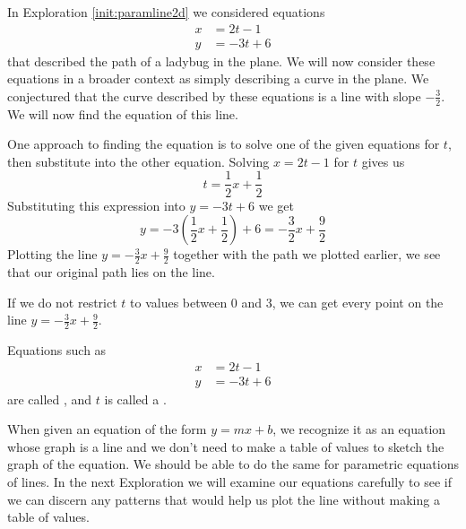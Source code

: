 \documentclass{ximera}
\begin{document}
\begin{exploration}\label{init:paramline2dpart2}
In Exploration \ref{init:paramline2d} we considered equations
\begin{align*}
x&=2t-1\\
y&=-3t+6
\end{align*}
that described the path of a ladybug in the plane.  We will now consider these equations in a broader context as simply describing a curve in the plane.  We conjectured that the curve described by these equations is a line with slope $-\frac{3}{2}$.  We will now find the equation of this line.
 
One approach to finding the equation is to solve one of the given equations for $t$, then substitute into the other equation.
Solving $x=2t-1$ for $t$ gives us
$$t=\frac{1}{2}x+\frac{1}{2}$$
Substituting this expression into $y=-3t+6$ we get
$$y=-3\left(\frac{1}{2}x+\frac{1}{2}\right)+6=-\frac{3}{2}x+\frac{9}{2}$$
Plotting the line $y=-\frac{3}{2}x+\frac{9}{2}$ together with the path we plotted earlier, we see that our original path lies on the line.
 
  \begin{center}
\end{center}
 
If we do not restrict $t$ to values between 0 and 3, we can get every point on the line $y=-\frac{3}{2}x+\frac{9}{2}$. 
\end{exploration}
 
Equations such as
\begin{align*}
x&=2t-1\\
y&=-3t+6
\end{align*}
are called , and $t$ is called a .
 
When given an equation of the form $y=mx+b$, we recognize it as an equation whose graph is a line and we don't need to make a table of values to sketch the graph of the equation.  We should be able to do the same for parametric equations of lines.  In the next Exploration we will examine our equations carefully to see if we can discern any patterns that would help us plot the line without making a table of values. 
 
\end{document}
